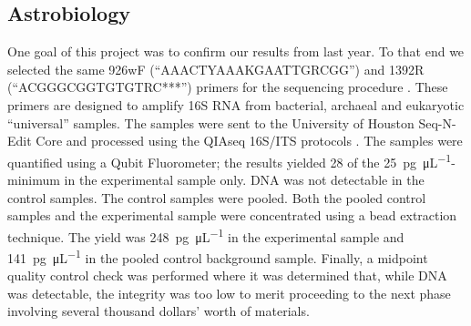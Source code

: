 \subsection{Astrobiology}
\label{sec:Astrobiology-Results}

One goal of this project was to confirm our results from last year. To that end we selected the same 926wF (“AAACTYAAAKGAATTGRCGG”) and 1392R (“ACGGGCGGTGTGTRC***”) primers for the sequencing procedure \cite{SORA}. These primers are designed to amplify 16S RNA from bacterial, archaeal and eukaryotic “universal” samples. The samples were sent to the University of Houston Seq-N-Edit Core \cite{Seq-N-Edit Core} and processed using the QIAseq 16S/ITS protocols \cite{QIAseq}. The samples were quantified using a Qubit Fluorometer; the results yielded 28 of the \SI{25}{\pico\gram\per\micro\liter}-minimum in the experimental sample only. DNA was not detectable in the control samples. The control samples were pooled. Both the pooled control samples and the experimental sample were concentrated using a bead extraction technique. The yield was \SI{248}{\pico\gram\per\micro\liter} in the experimental sample and \SI{141}{\pico\gram\per\micro\liter} in the pooled control background sample. Finally, a midpoint quality control check was  performed where it was determined that, while DNA was detectable, the integrity was too low to merit proceeding to the next phase involving several thousand dollars’ worth of materials. 